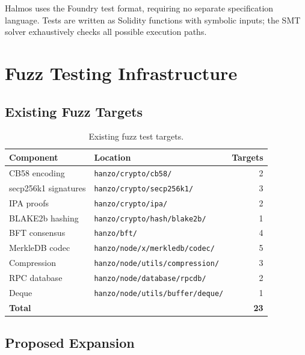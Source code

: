 \documentclass[11pt,letterpaper]{article}
\begin{document}
Halmos uses the Foundry test format, requiring no separate specification language. Tests are written as Solidity functions with symbolic inputs; the SMT solver exhaustively checks all possible execution paths.

\section{Fuzz Testing Infrastructure}

\subsection{Existing Fuzz Targets}

\begin{table}[H]
\centering
\begin{tabular}{@{}llr@{}}
\toprule
\textbf{Component} & \textbf{Location} & \textbf{Targets} \\
\midrule
CB58 encoding & \texttt{hanzo/crypto/cb58/} & 2 \\
secp256k1 signatures & \texttt{hanzo/crypto/secp256k1/} & 3 \\
IPA proofs & \texttt{hanzo/crypto/ipa/} & 2 \\
BLAKE2b hashing & \texttt{hanzo/crypto/hash/blake2b/} & 1 \\
BFT consensus & \texttt{hanzo/bft/} & 4 \\
MerkleDB codec & \texttt{hanzo/node/x/merkledb/codec/} & 5 \\
Compression & \texttt{hanzo/node/utils/compression/} & 3 \\
RPC database & \texttt{hanzo/node/database/rpcdb/} & 2 \\
Deque & \texttt{hanzo/node/utils/buffer/deque/} & 1 \\
\midrule
\textbf{Total} & & \textbf{23} \\
\bottomrule
\end{tabular}
\caption{Existing fuzz test targets.}
\label{tab:fuzz-existing}
\end{table}

\subsection{Proposed Expansion}
\end{document}
